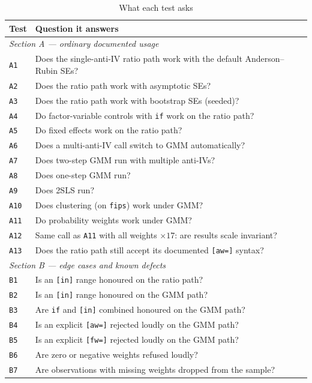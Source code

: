 \documentclass[11pt]{article}
\newcommand{\code}[1]{\texttt{\small #1}}
\begin{document}
\begin{table}[htbp]
\centering
\caption{What each test asks}
\label{tab:tests}
\footnotesize
\begin{tabular}{ll}
\toprule
Test & Question it answers \\
\midrule
\multicolumn{2}{l}{\textit{Section A --- ordinary documented usage}} \\
\code{A1}   & Does the single-anti-IV ratio path work with the default Anderson--Rubin SEs? \\
\code{A2}   & Does the ratio path work with asymptotic SEs? \\
\code{A3}   & Does the ratio path work with bootstrap SEs (seeded)? \\
\code{A4}   & Do factor-variable controls with \code{if} work on the ratio path? \\
\code{A5}   & Do fixed effects work on the ratio path? \\
\code{A6}   & Does a multi-anti-IV call switch to GMM automatically? \\
\code{A7}   & Does two-step GMM run with multiple anti-IVs? \\
\code{A8}   & Does one-step GMM run? \\
\code{A9}   & Does 2SLS run? \\
\code{A10}  & Does clustering (on \code{fips}) work under GMM? \\
\code{A11}  & Do probability weights work under GMM? \\
\code{A12}  & Same call as \code{A11} with all weights $\times 17$: are results scale invariant? \\
\code{A13}  & Does the ratio path still accept its documented \code{[aw=]} syntax? \\
\midrule
\multicolumn{2}{l}{\textit{Section B --- edge cases and known defects}} \\
\code{B1}   & Is an \code{[in]} range honoured on the ratio path? \\
\code{B2}   & Is an \code{[in]} range honoured on the GMM path? \\
\code{B3}   & Are \code{if} and \code{[in]} combined honoured on the GMM path? \\
\code{B4}   & Is an explicit \code{[aw=]} rejected loudly on the GMM path? \\
\code{B5}   & Is an explicit \code{[fw=]} rejected loudly on the GMM path? \\
\code{B6}   & Are zero or negative weights refused loudly? \\
\code{B7}   & Are observations with missing weights dropped from the sample? \\

\end{tabular}
\end{table}
\end{document}
